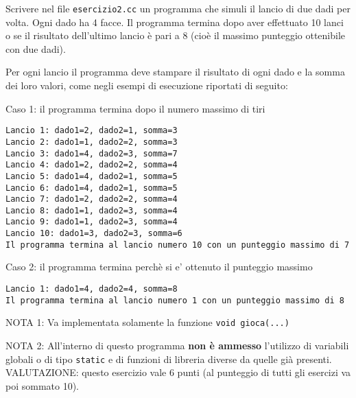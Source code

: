 %

Scrivere nel file {\tt esercizio2.cc} un programma che simuli il lancio di due dadi per volta. Ogni dado ha 4 facce. Il programma termina dopo aver effettuato 10 lanci o se il risultato dell'ultimo lancio \`e pari a 8 (cio\`e il massimo punteggio ottenibile con due dadi).

Per ogni lancio il programma deve stampare il risultato di ogni dado e la somma dei loro valori, come negli esempi di esecuzione riportati di seguito:

Caso 1: il programma termina dopo il numero massimo di tiri
\begin{verbatim}
Lancio 1: dado1=2, dado2=1, somma=3
Lancio 2: dado1=1, dado2=2, somma=3
Lancio 3: dado1=4, dado2=3, somma=7
Lancio 4: dado1=2, dado2=2, somma=4
Lancio 5: dado1=4, dado2=1, somma=5
Lancio 6: dado1=4, dado2=1, somma=5
Lancio 7: dado1=2, dado2=2, somma=4
Lancio 8: dado1=1, dado2=3, somma=4
Lancio 9: dado1=1, dado2=3, somma=4
Lancio 10: dado1=3, dado2=3, somma=6
Il programma termina al lancio numero 10 con un punteggio massimo di 7
\end{verbatim}

Caso 2: il programma termina perch\`e si e' ottenuto il punteggio massimo
\begin{verbatim}
Lancio 1: dado1=4, dado2=4, somma=8
Il programma termina al lancio numero 1 con un punteggio massimo di 8
\end{verbatim}

\vspace{.5cm}

NOTA 1: Va implementata solamente la funzione \verb|void gioca(...)|

NOTA 2: All'interno di questo programma {\bf non \`e ammesso} 
l'utilizzo di variabili globali o di tipo {\tt static} e di 
funzioni di libreria diverse da quelle gi\`a presenti. \\

VALUTAZIONE:
questo esercizio vale 6 punti (al punteggio di tutti gli esercizi va poi sommato 10).

%


